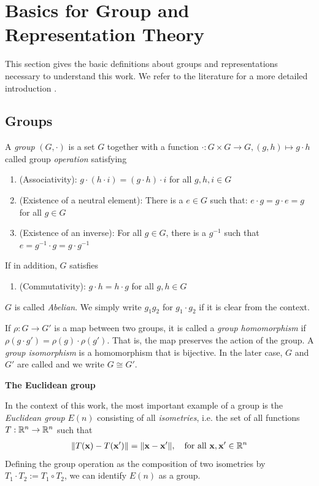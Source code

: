 \section{Basics for Group and Representation Theory}

This section gives the basic definitions about groups and representations necessary to understand this work.
We refer to the literature for a more detailed introduction \parencite{artin2011algebra,GroupRepRef}.
\label{sec:intro_to_groups}
\subsection{Groups}

A \textit{group} $(G,\cdot)$ is a set $G$ together with a function $\cdot:G\times G\to G, (g,h)\mapsto g\cdot h$ called group \emph{operation} satisfying \begin{enumerate} \item (Associativity): $g\cdot(h\cdot i)=(g\cdot h)\cdot i$ for all $g,h,i\in G$ \item (Existence of a neutral element): There is a $e\in G$ such that: $e\cdot g=g\cdot e= g$ for all $g\in G$ \item (Existence of an inverse): For all $g\in G$, there is a $g^{-1}$ such that $e=g^{-1}\cdot g=g\cdot g^{-1}$ \end{enumerate} If in addition, $G$ satisfies \begin{enumerate}[resume] \item (Commutativity): $g\cdot h=h\cdot g$ for all $g,h\in G$ \end{enumerate} $G$ is called \emph{Abelian}.
We simply write $g_1g_2$ for $g_1\cdot g_2$ if it is clear from the context.

If $\rho:G\to G'$ is a map between two groups, it is called a \emph{group homomorphism} if $\rho(g\cdot g')=\rho(g)\cdot\rho(g')$.
That is, the map preserves the action of the group.
A \emph{group isomorphism} is a homomorphism that is bijective.
In the later case, $G$ and $G'$ are called  and we write $G\cong G'$.

\textbf{The Euclidean group}

In the context of this work, the most important example of a group is the \emph{Euclidean group} $E(n)$ consisting of all \emph{isometries}, i.e. the set of all functions $T:\mathbb{R}^n\to\mathbb{R}^n$ such that \begin{align*} \|T(\mathbf{x})-T(\mathbf{x}')\|=\|\mathbf{x}-\mathbf{x}'\|,\quad\text{for all }\mathbf{x},\mathbf{x}'\in\R^n \end{align*} Defining the group operation as the composition of two isometries by $T_1\cdot T_2:=T_1\circ T_2$, we can identify $E(n)$ as a group.

